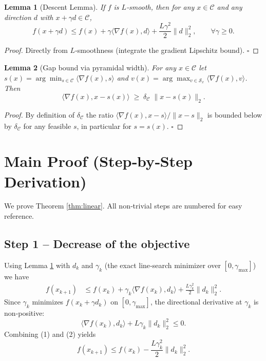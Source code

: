 \documentclass{article}
\newtheorem{lemma}{Lemma}[section]
\begin{document}
\begin{lemma}[Descent Lemma]\label{lem:descent}
If $f$ is $L$‑smooth, then for any $x\in\mathcal{C}$ and any direction $d$ with $x+\gamma d\in\mathcal{C}$,
\[
f(x+\gamma d)\le f(x)+\gamma\langle\nabla f(x),d\rangle+\frac{L\gamma^2}{2}\|d\|_2^2,\qquad\forall\gamma\ge0.
\]
\end{lemma}
\begin{proof}
Directly from $L$‑smoothness (integrate the gradient Lipschitz bound). \hfill $\square$
\end{proof}

\begin{lemma}[Gap bound via pyramidal width]\label{lem:gap}
For any $x\in\mathcal{C}$ let $s(x)=\arg\min_{s\in\mathcal{C}}\langle\nabla f(x),s\rangle$ and $v(x)=\arg\max_{v\in\mathcal{S}_x}\langle\nabla f(x),v\rangle$. Then
\[
\langle\nabla f(x),x-s(x)\rangle\;\ge\;\delta_{\mathcal{C}}\;\|x-s(x)\|_2 .
\]
\end{lemma}
\begin{proof}
By definition of $\delta_{\mathcal{C}}$ the ratio $\langle\nabla f(x),x-s\rangle/\|x-s\|_2$ is bounded below by $\delta_{\mathcal{C}}$ for any feasible $s$, in particular for $s=s(x)$. \hfill $\square$
\end{proof}

\section*{Main Proof (Step‑by‑Step Derivation)}

We prove Theorem \ref{thm:linear}.  
All non‑trivial steps are numbered for easy reference.

\subsection*{Step 1 – Decrease of the objective}
Using Lemma \ref{lem:descent} with $d_k$ and $\gamma_k$ (the exact line‑search minimizer over $[0,\gamma_{\max}]$) we have
\begin{align}
f(x_{k+1}) 
&\le f(x_k)+\gamma_k\langle\nabla f(x_k),d_k\rangle+\frac{L\gamma_k^2}{2}\|d_k\|_2^2. \tag{1}
\end{align}
Since $\gamma_k$ minimizes $f(x_k+\gamma d_k)$ on $[0,\gamma_{\max}]$, the directional derivative at $\gamma_k$ is non‑positive:
\[
\langle\nabla f(x_k),d_k\rangle+L\gamma_k\|d_k\|_2^2\le 0. \tag{2}
\]
Combining (1) and (2) yields
\[
f(x_{k+1})\le f(x_k)-\frac{L\gamma_k^2}{2}\|d_k\|_2^2. \tag{3}
\]
\end{document}

